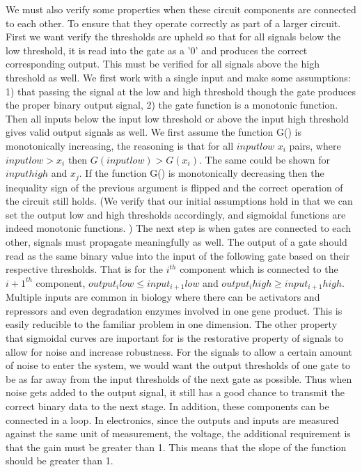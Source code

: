 \documentclass{article}
\begin{document}
\newline
We must also verify some properties when these circuit components are connected to each other.  To ensure that they operate correctly as part of a larger circuit. First we want verify the thresholds are upheld so that for all signals below the low threshold, it is read into the gate as a '0' and produces the correct corresponding output.  This must be verified for all signals above the high threshold as well. We first work with a single input and make some assumptions:  1) that passing the signal at the low and high threshold though the gate produces the proper binary output signal, 2) the gate function is a monotonic function.  Then all inputs below the input low threshold or above the input high threshold gives valid output signals as well.  We first assume the function G() is monotonically increasing, the reasoning is that for all $input low$ $x_i$ pairs, where $input low>x_i$ then $G(input low)>G(x_i)$.  The same could be shown for $input high$ and $x_j$.  If the function G() is monotonically decreasing then the inequality sign of the previous argument is flipped and the correct operation of the circuit still holds.  (We verify that our initial assumptions hold in that we can set the output low and high thresholds accordingly, and sigmoidal functions are indeed monotonic functions. )
\newline \newline
The next step is when gates are connected to each other, signals must propagate meaningfully as well.  The output of a gate should read as the same binary value into the input of the following gate based on their respective thresholds.  That is for the $i^{th}$ component which is connected to the $i+1^{th}$ component, $output_i low \leq input_{i+1} low$ and $output_i high \geq input_{i+1} high$.  Multiple inputs are common in biology where there can be activators and repressors and even degradation enzymes involved in one gene product.  This is easily reducible to the familiar problem in one dimension. 
\newline \newline
The other property that sigmoidal curves are important for is the restorative property of signals to allow for noise and increase robustness.  For the signals to allow a certain amount of noise to enter the system, we would want the output thresholds of one gate to be as far away from the input thresholds of the next gate as possible.  Thus when noise gets added to the output signal, it still has a good chance to transmit the correct binary data to the next stage.  In addition, these components can be connected in a loop.  In electronics, since the outputs and inputs are measured against the same unit of measurement, the voltage, the additional requirement is that the gain must be greater than 1.  This means that the slope of the function should be greater than 1.  
\newline \newline
\end{document}
